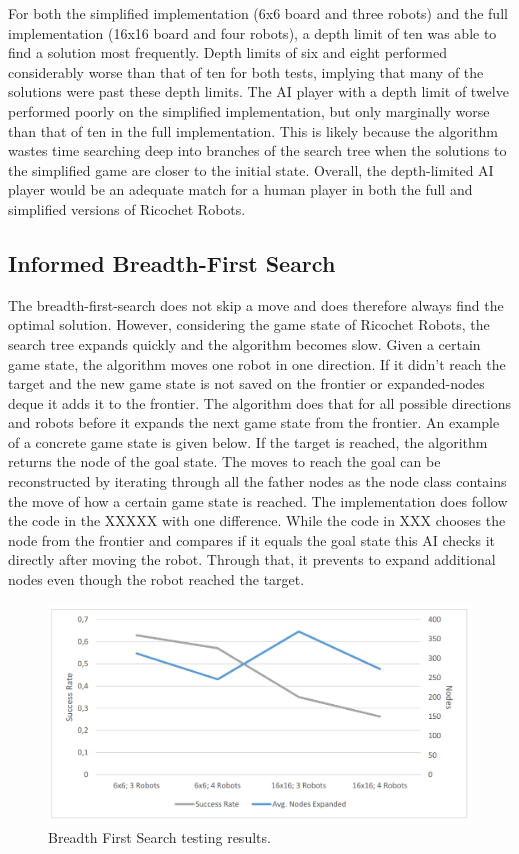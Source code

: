 \documentclass[a4paper,10pt]{article}
\begin{document}
  For both the simplified implementation (6x6 board and three robots) and the full implementation (16x16 board and four robots), a depth limit of ten was able to
  find a solution most frequently.  Depth limits of six and eight performed considerably worse than that of ten for both tests, implying that many of the solutions were
  past these depth limits.  The AI player with a depth limit of twelve performed poorly on the simplified implementation, but only marginally worse than that of ten in
  the full implementation.  This is likely because the algorithm wastes time searching deep into branches of the search tree when the solutions to the simplified game
  are closer to the initial state.  Overall, the depth-limited AI player would be an adequate match for a human player in both the full and simplified versions of
  Ricochet Robots.\\

  \subsection{Informed Breadth-First Search}
  The breadth-first-search does not skip a move and does therefore always find the optimal solution. However, considering the game state of Ricochet Robots, the search tree expands quickly and the algorithm becomes slow. Given a certain game state, the algorithm moves one robot in one direction. If it didn't reach the target and the new game state is not saved on the frontier or expanded-nodes deque it adds it to the frontier. The algorithm does that for all possible directions and robots before it expands the next game state from the frontier. An example of a concrete game state is given below. If the target is reached, the algorithm returns the node of the goal state. The moves to reach the goal can be reconstructed by iterating through all the father nodes as the node class contains the move of how a certain game state is reached. The implementation does follow the code in the XXXXX with one difference. While the code in XXX chooses the node from the frontier and compares if it equals the goal state this AI checks it directly after moving the robot. Through that, it prevents to expand additional nodes even though the robot reached the target.

  \begin{figure}
  	\centering
  	\label{fig_bfs:test}
  	\includegraphics[scale=0.47]{figures/Bfs_test_results.PNG}
  	\caption{Breadth First Search testing results.}
  \end{figure}
\end{document}
